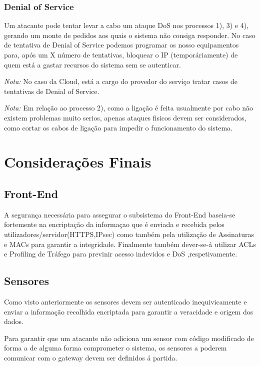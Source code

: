 \subsubsection{Denial of Service}
\par\hfill
\par Um atacante pode tentar levar a cabo um ataque DoS nos processos 1), 3) e 4), gerando um monte de pedidos aos quais o sistema não consiga responder. No caso de tentativa de Denial of Service podemos programar os nosso equipamentos para, após um X número de tentativas, bloquear o IP (temporáriamente) de quem está a gastar recursos do sistema sem se autenticar.\newline

\textit{Nota:} No caso da Cloud, está a cargo do provedor do serviço tratar casos de tentativas de Denial of Service.\newline



\textit{Nota:} Em relação ao processo 2), como a ligação é feita usualmente por cabo não existem problemas muito serios, apenas ataques fisicos devem ser considerados, como cortar os cabos de ligação para impedir o funcionamento do sistema.\newline


\section{Considerações Finais}

\subsection{Front-End}
\hfill

A segurança necessária para assegurar o subsistema do Front-End baseia-se fortemente na encriptação da informaçao que é enviada e recebida pelos utilizadores/servidor(HTTPS,IPsec) como também pela utilização de Assinaturas e MACs para garantir a integridade. Finalmente também dever-se-á utilizar ACLs e Profiling de Tráfego para previnir acesso indevidos e DoS ,respetivamente.


\subsection{Sensores}
\par\hfill
\par Como visto anteriormente os sensores devem ser autenticado inequivicamente e enviar a informação recolhida encriptada para garantir a veracidade e origem dos dados.\newline
\par Para garantir que um atacante não adiciona um sensor com código modificado de forma a de alguma forma comprometer o sistema, os sensores a poderem comunicar com o gateway devem ser definidos á partida.\newline

